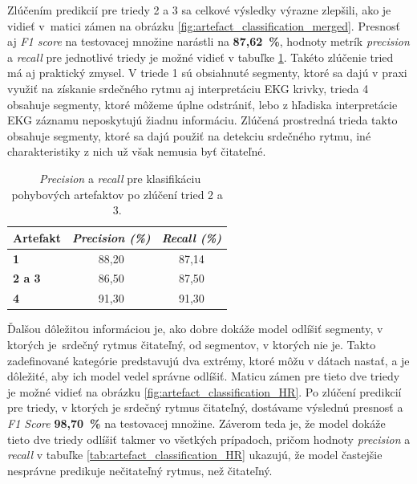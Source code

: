 Zlúčením predikcií pre triedy 2 a 3 sa celkové výsledky výrazne zlepšili, ako je vidieť v~matici zámen na obrázku \ref{fig:artefact_classification_merged}. Presnosť aj \textit{F1 score} na testovacej množine narástli na \textbf{87,62~\%}, hodnoty metrík \textit{precision} a \textit{recall} pre jednotlivé triedy je možné vidieť v tabuľke \ref{tab:artefact_classification_merged}. Takéto zlúčenie tried má aj praktický zmysel. V triede 1 sú obsiahnuté segmenty, ktoré sa dajú v praxi využiť na získanie srdečného rytmu aj interpretáciu EKG krivky, trieda 4 obsahuje segmenty, ktoré môžeme úplne odstrániť, lebo z hľadiska interpretácie EKG záznamu neposkytujú žiadnu informáciu. Zlúčená prostredná trieda takto obsahuje segmenty, ktoré sa dajú použiť na detekciu srdečného rytmu, iné charakteristiky z nich už však nemusia byť čitateľné.

\begin{table}[H]\centering
\caption[\textit{Precision} a \textit{recall} pre klasifikáciu pohybových artefaktov po zlúčení tried 2 a 3.]{~\textit{Precision} a \textit{recall} pre klasifikáciu pohybových artefaktov po zlúčení tried 2 a 3.}\label{tab:artefact_classification_merged}
    \begin{tabular}{l|c|c}
    	\textbf{Artefakt} & \textit{\textbf{Precision (\%)}} & \textit{\textbf{Recall (\%)}} \tabularnewline \hline 
     	\textbf{1}        & 88,20	                      &  87,14                         \tabularnewline \hline
     	\textbf{2 a 3}	  & 86,50	                      &  87,50                           \tabularnewline \hline
        \textbf{4}	      & 91,30	                      &  91,30                           \tabularnewline
    \end{tabular}
\end{table}

Ďalšou dôležitou informáciou je, ako dobre dokáže model odlíšiť segmenty, v ktorých je~srdečný rytmus čitateľný, od segmentov, v ktorých nie je. Takto zadefinované kategórie predstavujú dva extrémy, ktoré môžu v dátach nastať, a je dôležité, aby ich model vedel správne odlíšiť. Maticu zámen pre tieto dve triedy je možné vidieť na obrázku \ref{fig:artefact_classification_HR}. Po zlúčení predikcií pre triedy, v ktorých je srdečný rytmus čitateľný, dostávame výslednú presnosť a \textit{F1 Score} \textbf{98,70~\%} na testovacej množine. Záverom teda je, že model dokáže tieto dve triedy odlíšiť takmer vo všetkých prípadoch, pričom hodnoty \textit{precision} a \textit{recall} v tabuľke \ref{tab:artefact_classification_HR} ukazujú, že model častejšie nesprávne predikuje nečitateľný rytmus, než čitateľný.


